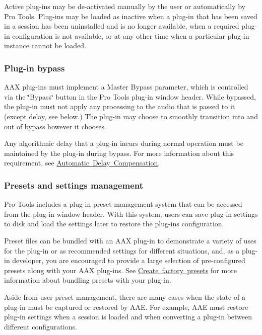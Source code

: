 Active plug-\/ins may be de-\/activated manually by the user or automatically by Pro Tools. Plug-\/ins may be loaded as inactive when a plug-\/in that has been saved in a session has been uninstalled and is no longer available, when a required plug-\/in configuration is not available, or at any other time when a particular plug-\/in instance cannot be loaded.

\hypertarget{a00830_subsection__plugin_bypass}{}\subsubsection{Plug-\/in bypass}\label{a00830_subsection__plugin_bypass}
 A\+AX plug-\/ins must implement a Master Bypass parameter, which is controlled via the \char`\"{}\+Bypass\char`\"{} button in the Pro Tools plug-\/in window header. While bypassed, the plug-\/in must not apply any processing to the audio that is passed to it (except delay, see below.) The plug-\/in may choose to smoothly transition into and out of bypass however it chooses.

Any algorithmic delay that a plug-\/in incurs during normal operation must be maintained by the plug-\/in during bypass. For more information about this requirement, see \mbox{\hyperlink{a00830_subsubsection__automatic_delay_compensation_}{Automatic Delay Compensation}}.

\hypertarget{a00830_subsection__presets_and_settings_management}{}\subsubsection{Presets and settings management}\label{a00830_subsection__presets_and_settings_management}
Pro Tools includes a plug-\/in preset management system that can be accessed from the plug-\/in window header. With this system, users can save plug-\/in settings to disk and load the settings later to restore the plug-\/in\textquotesingle{}s configuration.

Preset files can be bundled with an A\+AX plug-\/in to demonstrate a variety of uses for the plug-\/in or as recommended settings for different situations, and, as a plug-\/in developer, you are encouraged to provide a large selection of pre-\/configured presets along with your A\+AX plug-\/ins. See \mbox{\hyperlink{a00843_aax_distributing_finishing_factorypresets}{Create factory presets}} for more information about bundling presets with your plug-\/in.

Aside from user preset management, there are many cases when the state of a plug-\/in must be captured or restored by A\+AE. For example, A\+AE must restore plug-\/in settings when a session is loaded and when converting a plug-\/in between different configurations.

